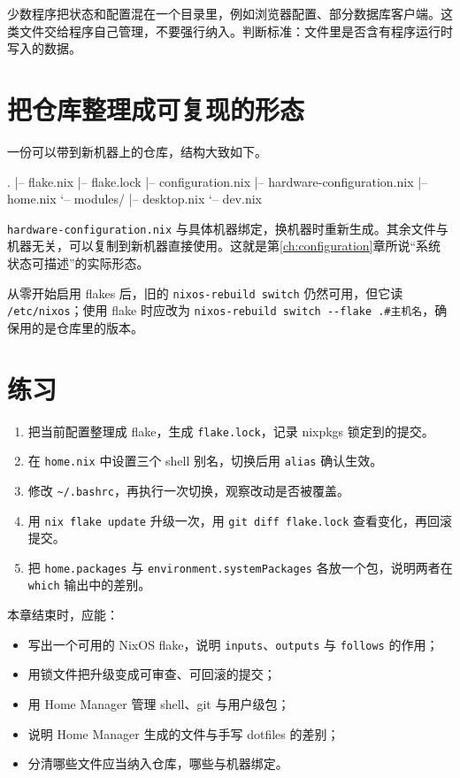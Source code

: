 \begin{notebox}
少数程序把状态和配置混在一个目录里，例如浏览器配置、部分数据库客户端。这类文件交给程序自己管理，不要强行纳入。判断标准：文件里是否含有程序运行时写入的数据。
\end{notebox}

\section{把仓库整理成可复现的形态}

一份可以带到新机器上的仓库，结构大致如下。

\begin{textcode}
.
|-- flake.nix
|-- flake.lock
|-- configuration.nix
|-- hardware-configuration.nix
|-- home.nix
`-- modules/
    |-- desktop.nix
    `-- dev.nix
\end{textcode}

\texttt{hardware-configuration.nix} 与具体机器绑定，换机器时重新生成。其余文件与机器无关，可以复制到新机器直接使用。这就是第\ref{ch:configuration}章所说“系统状态可描述”的实际形态。

从零开始启用 flakes 后，旧的 \texttt{nixos-rebuild switch} 仍然可用，但它读 \texttt{/etc/nixos}；使用 flake 时应改为 \texttt{nixos-rebuild switch -{}-flake .\#主机名}，确保用的是仓库里的版本。

\section{练习}

\begin{enumerate}
  \item 把当前配置整理成 flake，生成 \texttt{flake.lock}，记录 nixpkgs 锁定到的提交。
  \item 在 \texttt{home.nix} 中设置三个 shell 别名，切换后用 \texttt{alias} 确认生效。
  \item 修改 \texttt{\textasciitilde/.bashrc}，再执行一次切换，观察改动是否被覆盖。
  \item 用 \texttt{nix flake update} 升级一次，用 \texttt{git diff flake.lock} 查看变化，再回滚提交。
  \item 把 \texttt{home.\allowbreak{}packages} 与 \texttt{environment.\allowbreak{}systemPackages} 各放一个包，说明两者在 \texttt{which} 输出中的差别。
\end{enumerate}

\begin{checkpoint}
本章结束时，应能：
\begin{itemize}
  \item 写出一个可用的 NixOS flake，说明 \texttt{inputs}、\texttt{outputs} 与 \texttt{follows} 的作用；
  \item 用锁文件把升级变成可审查、可回滚的提交；
  \item 用 Home Manager 管理 shell、git 与用户级包；
  \item 说明 Home Manager 生成的文件与手写 dotfiles 的差别；
  \item 分清哪些文件应当纳入仓库，哪些与机器绑定。
\end{itemize}
\end{checkpoint}
